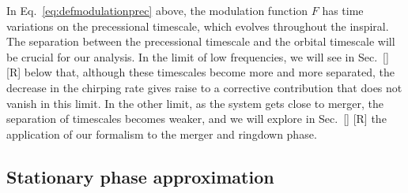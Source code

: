 \documentclass[aps,showpacs,twocolumn,
prd,superscriptaddress,nofootinbib]{revtex4-1}
\newcommand{\SM}[1]{{\color{Red} #1}}
\begin{document}
In Eq.~\eqref{eq:defmodulationprec} above, the modulation function $F$ has time variations on the precessional timescale, which evolves throughout the inspiral. The separation between the precessional timescale and the orbital timescale will be crucial for our analysis. In the limit of low frequencies, we will see in Sec.~\ref{} \SM{[R]} below that, although these timescales become more and more separated, the decrease in the chirping rate gives raise to a corrective contribution that does not vanish in this limit. In the other limit, as the system gets close to merger, the separation of timescales becomes weaker, and we will explore in Sec.~\ref{} \SM{[R]} the application of our formalism to the merger and ringdown phase.


\subsection{Stationary phase approximation}
\label{subsec:SPA}
\end{document}
